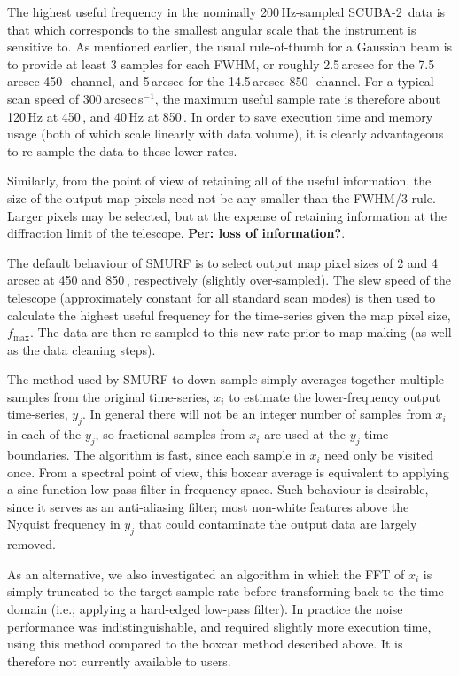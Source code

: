 \documentclass[useAMS,usenatbib,nofootinbib]{mn2e}
\newcommand{\scuba}{SCUBA-2}
\begin{document}
The highest useful frequency in the nominally 200\,Hz-sampled
\scuba\ data is that which corresponds to the smallest angular scale
that the instrument is sensitive to. As mentioned earlier, the usual
rule-of-thumb for a Gaussian beam is to provide at least 3 samples for
each FWHM, or roughly 2.5\,arcsec for the 7.5\,arcsec
450\,\micron\ channel, and 5\,arcsec for the 14.5\,arcsec
850\,\micron\ channel. For a typical scan speed of
300\,arcsec\,s$^{-1}$, the maximum useful sample rate is therefore
about 120\,Hz at 450\,\micron, and 40\,Hz at 850\,\micron. In order to
save execution time and memory usage (both of which scale linearly
with data volume), it is clearly advantageous to re-sample the data to
these lower rates.

Similarly, from the point of view of retaining all of the useful
information, the size of the output map pixels need not be any smaller
than the FWHM/3 rule. Larger pixels may be selected, but at the
expense of retaining information at the diffraction limit of the
telescope.  \textbf{ Per: loss of information?}.


The default behaviour of SMURF is to select output map pixel sizes of
2 and 4\,arcsec at 450 and 850\,\micron, respectively (slightly
over-sampled). The slew speed of the telescope (approximately constant
for all standard scan modes) is then used to calculate the highest
useful frequency for the time-series given the map pixel size,
$f_\mathrm{max}$. The data are then re-sampled to this new rate prior
to map-making (as well as the data cleaning steps).

The method used by SMURF to down-sample simply averages together
multiple samples from the original time-series, $x_i$ to estimate the
lower-frequency output time-series, $y_j$. In general there will not
be an integer number of samples from $x_i$ in each of the $y_j$, so
fractional samples from $x_i$ are used at the $y_j$ time
boundaries. The algorithm is fast, since each sample in $x_i$ need
only be visited once. From a spectral point of view, this boxcar
average is equivalent to applying a sinc-function low-pass filter in
frequency space. Such behaviour is desirable, since it serves as an
anti-aliasing filter; most non-white features above the Nyquist
frequency in $y_j$ that could contaminate the output data are largely
removed.

As an alternative, we also investigated an algorithm in which the FFT
of $x_i$ is simply truncated to the target sample rate before
transforming back to the time domain (i.e., applying a hard-edged
low-pass filter). In practice the noise performance was
indistinguishable, and required slightly more execution time, using
this method compared to the boxcar method described above. It is
therefore not currently available to users.
\end{document}
